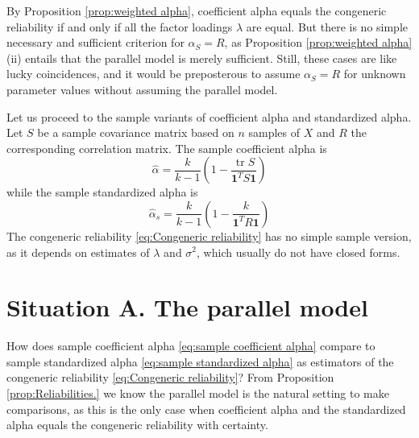 \documentclass[twoside]{article}
\DeclareMathOperator{\tr}{tr}
\begin{document}

By Proposition \ref{prop:weighted alpha}, coefficient alpha equals the congeneric reliability if and only if all the factor loadings $\lambda$ are equal. But there is no simple necessary and sufficient criterion for $\alpha_S =  R$, as Proposition \ref{prop:weighted alpha} (ii) entails that the parallel model is merely sufficient. Still, these cases are like lucky coincidences, and it would be preposterous to assume $\alpha_S =  R$ for unknown parameter values without assuming the parallel model.

Let us proceed to the sample variants of coefficient alpha and standardized
alpha. Let $S$ be a sample covariance matrix based on
$n$ samples of $X$ and $R$ the corresponding correlation matrix.
The sample coefficient alpha is 
\begin{equation}
\hat{\alpha}=\frac{k}{k-1}\left(1-\frac{\tr{S}}{\boldsymbol{1}^{T}S\boldsymbol{1}}\right)\label{eq:sample coefficient alpha}
\end{equation}
while the sample standardized alpha is
\begin{equation}
\hat{\alpha}_s=\frac{k}{k-1}\left(1-\frac{k}{\boldsymbol{1}^{T}R\boldsymbol{1}}\right)\label{eq:sample standardized alpha}
\end{equation}
The congeneric reliability \eqref{eq:Congeneric reliability} has no
simple sample version, as it depends on estimates of $\lambda$ and
$\sigma^2$, which usually do not have closed forms.

\section{Situation A. The parallel model}
\label{sec:argument A}

How does sample coefficient alpha \eqref{eq:sample coefficient alpha} compare to sample standardized alpha \eqref{eq:sample standardized alpha} as estimators of the congeneric reliability \eqref{eq:Congeneric reliability}? From Proposition \ref{prop:Reliabilities.} we know the parallel model is the natural setting to make comparisons, as this is the only case when coefficient alpha and the standardized alpha equals the congeneric reliability with certainty.
\end{document}
